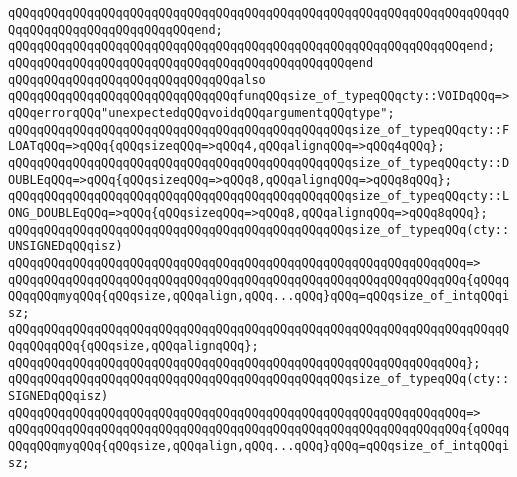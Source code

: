 \verb|qQQqqQQqqQQqqQQqqQQqqQQqqQQqqQQqqQQqqQQqqQQqqQQqqQQqqQQqqQQqqQQqqQQqqQQqqQQqqQQqqQQqqQQqqQQqqQQqend;|\newline
\verb|qQQqqQQqqQQqqQQqqQQqqQQqqQQqqQQqqQQqqQQqqQQqqQQqqQQqqQQqqQQqqQQqend;|\newline
\verb|qQQqqQQqqQQqqQQqqQQqqQQqqQQqqQQqqQQqqQQqqQQqqQQqend|\newline
\newline
\verb|qQQqqQQqqQQqqQQqqQQqqQQqqQQqqQQqalso|\newline
\verb|qQQqqQQqqQQqqQQqqQQqqQQqqQQqqQQqfunqQQqsize_of_typeqQQqcty::VOIDqQQq=>qQQqerrorqQQq"unexpectedqQQqvoidqQQqargumentqQQqtype";|\newline
\verb|qQQqqQQqqQQqqQQqqQQqqQQqqQQqqQQqqQQqqQQqqQQqqQQqsize_of_typeqQQqcty::FLOATqQQq=>qQQq{qQQqsizeqQQq=>qQQq4,qQQqalignqQQq=>qQQq4qQQq};|\newline
\verb|qQQqqQQqqQQqqQQqqQQqqQQqqQQqqQQqqQQqqQQqqQQqqQQqsize_of_typeqQQqcty::DOUBLEqQQq=>qQQq{qQQqsizeqQQq=>qQQq8,qQQqalignqQQq=>qQQq8qQQq};|\newline
\verb|qQQqqQQqqQQqqQQqqQQqqQQqqQQqqQQqqQQqqQQqqQQqqQQqsize_of_typeqQQqcty::LONG_DOUBLEqQQq=>qQQq{qQQqsizeqQQq=>qQQq8,qQQqalignqQQq=>qQQq8qQQq};|\newline
\newline
\verb|qQQqqQQqqQQqqQQqqQQqqQQqqQQqqQQqqQQqqQQqqQQqqQQqsize_of_typeqQQq(cty::UNSIGNEDqQQqisz)|\newline
\verb|qQQqqQQqqQQqqQQqqQQqqQQqqQQqqQQqqQQqqQQqqQQqqQQqqQQqqQQqqQQqqQQq=>|\newline
\verb|qQQqqQQqqQQqqQQqqQQqqQQqqQQqqQQqqQQqqQQqqQQqqQQqqQQqqQQqqQQqqQQq{qQQqqQQqqQQqmyqQQq{qQQqsize,qQQqalign,qQQq...qQQq}qQQq=qQQqsize_of_intqQQqisz;|\newline
\newline
\verb|qQQqqQQqqQQqqQQqqQQqqQQqqQQqqQQqqQQqqQQqqQQqqQQqqQQqqQQqqQQqqQQqqQQqqQQqqQQqqQQq{qQQqsize,qQQqalignqQQq};|\newline
\verb|qQQqqQQqqQQqqQQqqQQqqQQqqQQqqQQqqQQqqQQqqQQqqQQqqQQqqQQqqQQqqQQq};|\newline
\newline
\verb|qQQqqQQqqQQqqQQqqQQqqQQqqQQqqQQqqQQqqQQqqQQqqQQqsize_of_typeqQQq(cty::SIGNEDqQQqisz)|\newline
\verb|qQQqqQQqqQQqqQQqqQQqqQQqqQQqqQQqqQQqqQQqqQQqqQQqqQQqqQQqqQQqqQQq=>|\newline
\verb|qQQqqQQqqQQqqQQqqQQqqQQqqQQqqQQqqQQqqQQqqQQqqQQqqQQqqQQqqQQqqQQq{qQQqqQQqqQQqmyqQQq{qQQqsize,qQQqalign,qQQq...qQQq}qQQq=qQQqsize_of_intqQQqisz;|\newline
